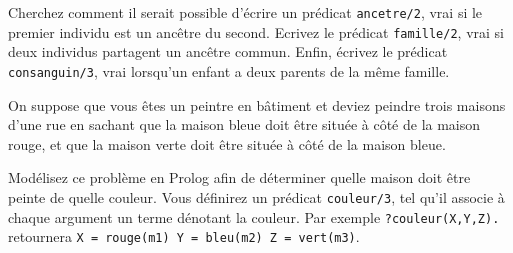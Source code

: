 \documentclass[a4paper]{article}
\newenvironment{CAnswer}{\color{red}\begin{Answer}}
                        {\end{Answer}}
\begin{document}
\begin{Exercise}[title={Généalogie}]
Cherchez comment il serait possible d'écrire un prédicat \verb$ancetre/2$, vrai
si le premier individu est un ancêtre du second. Ecrivez le prédicat
\verb$famille/2$, vrai si deux individus partagent un ancêtre commun. Enfin,
écrivez le prédicat \verb$consanguin/3$, vrai lorsqu'un enfant a deux parents de
la même famille.
\end{Exercise}
\begin{CAnswer}

\end{CAnswer}

\begin{Exercise}[title={Voisinage}]
On suppose que vous êtes un peintre en bâtiment et deviez peindre trois maisons
d'une rue en sachant que la maison bleue doit être située à côté de la maison
rouge, et que la maison verte doit être située à côté de la maison bleue. 
\begin{center}
\end{center}
Modélisez ce problème en Prolog afin de déterminer quelle maison doit être
peinte de quelle couleur. Vous définirez un prédicat \verb$couleur/3$, tel qu'il
associe à chaque argument un terme dénotant la couleur. Par exemple \verb$?­couleur(X,Y,Z).$
retournera \verb$X = rouge(m1) Y = bleu(m2) Z = vert(m3)$.
\end{Exercise}
\begin{CAnswer}

\end{CAnswer}
\end{document}
